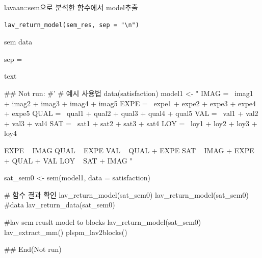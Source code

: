 \documentclass[a4paper]{book}
\begin{document}
%
\begin{Description}
lavaan::sem으로 분석한 함수에서 model추출
\end{Description}
%
\begin{Usage}
\begin{verbatim}
lav_return_model(sem_res, sep = "\n")
\end{verbatim}
\end{Usage}
%
\begin{Arguments}
\begin{ldescription}
\item[\code{sem\_res}] sem data

\item[\code{sep}] sep =
\end{ldescription}
\end{Arguments}
%
\begin{Value}
text
\end{Value}
%
\begin{Examples}
\begin{ExampleCode}

\#\# Not run: 
#'
# 예시 사용법
data(satisfaction)
model1 <- "
IMAG =~ imag1 + imag2 + imag3 + imag4 + imag5
EXPE =~ expe1 + expe2 + expe3 + expe4 + expe5
QUAL =~ qual1 + qual2 + qual3 + qual4 + qual5
VAL =~ val1 + val2 + val3 + val4
SAT =~ sat1 + sat2 + sat3 + sat4
LOY =~ loy1 + loy2 + loy3 + loy4

EXPE ~ IMAG
QUAL ~ EXPE
VAL ~  QUAL + EXPE
SAT ~ IMAG + EXPE + QUAL + VAL
LOY ~ SAT + IMAG
"

sat_sem0 <- sem(model1, data = satisfaction)

# 함수 결과 확인
lav_return_model(sat_sem0)
lav_return_model(sat_sem0)%
#data
lav_return_data(sat_sem0)

#lav sem reuslt  model to blocks
lav_return_model(sat_sem0)%
  lav_extract_mm()%
  plspm_lav2blocks()



## End(Not run)


\end{ExampleCode}
\end{Examples}
\end{document}
